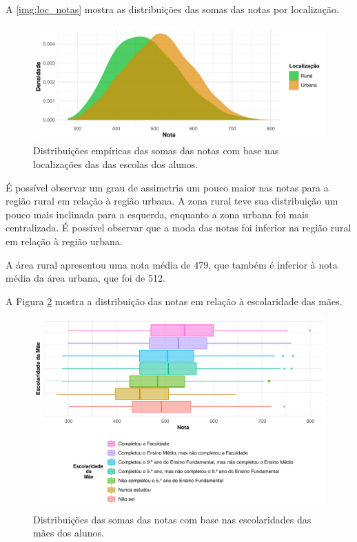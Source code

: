 \newpage
A \autoref{img:loc_notas} mostra as distribuições das somas das notas por localização.
\begin{figure}[htb]
    \caption{Distribuições empíricas das somas das notas com base nas localizações das
    das escolas dos alunos.\label{img:loc_notas}}
    \begin{center}
        \includegraphics[width=16cm]{img/loc_notas.pdf}
    \end{center}
\end{figure}

É possível observar um grau de assimetria um pouco maior nas notas para a região rural
em relação à região urbana. A zona rural teve sua distribuição um pouco mais inclinada
para a esquerda, enquanto a zona urbana foi mais centralizada. É possível observar que
a moda das notas foi inferior na região rural em relação à região urbana.

A área rural apresentou uma nota média de 479, que também é inferior à nota média da
área urbana, que foi de 512.

\newpage
A Figura \ref{img:esc_mae_notas} mostra a distribuição das notas em relação à escolaridade
das mães.
\begin{figure}[h]
    \caption{Distribuições das somas das notas com base nas escolaridades 
    das mães dos alunos.}
    \begin{center}
        \includegraphics[width=16cm]{img/esc_mae_notas.pdf}
    \end{center}
    \label{img:esc_mae_notas}
\end{figure}


